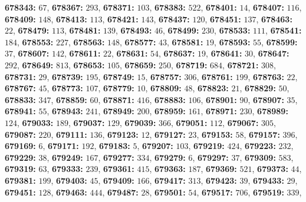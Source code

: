 \textsf{\bfseries 678343:} $67$, \textsf{\bfseries 678367:} $293$, \textsf{\bfseries 678371:} $103$, \textsf{\bfseries 678383:} $522$, \textsf{\bfseries 678401:} $14$, \textsf{\bfseries 678407:} $116$, \textsf{\bfseries 678409:} $148$, \textsf{\bfseries 678413:} $113$, \textsf{\bfseries 678421:} $143$, \textsf{\bfseries 678437:} $120$, \textsf{\bfseries 678451:} $137$, \textsf{\bfseries 678463:} $22$, \textsf{\bfseries 678479:} $113$, \textsf{\bfseries 678481:} $139$, \textsf{\bfseries 678493:} $46$, \textsf{\bfseries 678499:} $230$, \textsf{\bfseries 678533:} $111$, \textsf{\bfseries 678541:} $184$, \textsf{\bfseries 678553:} $227$, \textsf{\bfseries 678563:} $148$, \textsf{\bfseries 678577:} $43$, \textsf{\bfseries 678581:} $19$, \textsf{\bfseries 678593:} $55$, \textsf{\bfseries 678599:} $37$, \textsf{\bfseries 678607:} $142$, \textsf{\bfseries 678611:} $22$, \textsf{\bfseries 678631:} $54$, \textsf{\bfseries 678637:} $19$, \textsf{\bfseries 678641:} $30$, \textsf{\bfseries 678647:} $292$, \textsf{\bfseries 678649:} $813$, \textsf{\bfseries 678653:} $105$, \textsf{\bfseries 678659:} $250$, \textsf{\bfseries 678719:} $684$, \textsf{\bfseries 678721:} $308$, \textsf{\bfseries 678731:} $29$, \textsf{\bfseries 678739:} $195$, \textsf{\bfseries 678749:} $15$, \textsf{\bfseries 678757:} $306$, \textsf{\bfseries 678761:} $199$, \textsf{\bfseries 678763:} $22$, \textsf{\bfseries 678767:} $45$, \textsf{\bfseries 678773:} $107$, \textsf{\bfseries 678779:} $10$, \textsf{\bfseries 678809:} $48$, \textsf{\bfseries 678823:} $21$, \textsf{\bfseries 678829:} $50$, \textsf{\bfseries 678833:} $347$, \textsf{\bfseries 678859:} $60$, \textsf{\bfseries 678871:} $416$, \textsf{\bfseries 678883:} $106$, \textsf{\bfseries 678901:} $90$, \textsf{\bfseries 678907:} $35$, \textsf{\bfseries 678941:} $55$, \textsf{\bfseries 678943:} $241$, \textsf{\bfseries 678949:} $200$, \textsf{\bfseries 678959:} $161$, \textsf{\bfseries 678971:} $230$, \textsf{\bfseries 678989:} $124$, \textsf{\bfseries 679033:} $189$, \textsf{\bfseries 679037:} $129$, \textsf{\bfseries 679039:} $366$, \textsf{\bfseries 679051:} $112$, \textsf{\bfseries 679067:} $305$, \textsf{\bfseries 679087:} $220$, \textsf{\bfseries 679111:} $136$, \textsf{\bfseries 679123:} $12$, \textsf{\bfseries 679127:} $23$, \textsf{\bfseries 679153:} $58$, \textsf{\bfseries 679157:} $396$, \textsf{\bfseries 679169:} $6$, \textsf{\bfseries 679171:} $192$, \textsf{\bfseries 679183:} $5$, \textsf{\bfseries 679207:} $103$, \textsf{\bfseries 679219:} $424$, \textsf{\bfseries 679223:} $232$, \textsf{\bfseries 679229:} $38$, \textsf{\bfseries 679249:} $167$, \textsf{\bfseries 679277:} $334$, \textsf{\bfseries 679279:} $6$, \textsf{\bfseries 679297:} $37$, \textsf{\bfseries 679309:} $583$, \textsf{\bfseries 679319:} $63$, \textsf{\bfseries 679333:} $239$, \textsf{\bfseries 679361:} $415$, \textsf{\bfseries 679363:} $187$, \textsf{\bfseries 679369:} $521$, \textsf{\bfseries 679373:} $44$, \textsf{\bfseries 679381:} $199$, \textsf{\bfseries 679403:} $45$, \textsf{\bfseries 679409:} $166$, \textsf{\bfseries 679417:} $313$, \textsf{\bfseries 679423:} $39$, \textsf{\bfseries 679433:} $29$, \textsf{\bfseries 679451:} $128$, \textsf{\bfseries 679463:} $444$, \textsf{\bfseries 679487:} $28$, \textsf{\bfseries 679501:} $54$, \textsf{\bfseries 679517:} $706$, \textsf{\bfseries 679519:} $339$, 
